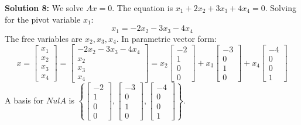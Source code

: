 \documentclass[11pt]{article}
\begin{document}
\vspace{0.3cm}
\textbf{Solution 8:} We solve $Ax = 0$. The equation is $x_1 + 2x_2 + 3x_3 + 4x_4 = 0$.
Solving for the pivot variable $x_1$:
$$ x_1 = -2x_2 - 3x_3 - 4x_4 $$
The free variables are $x_2, x_3, x_4$. In parametric vector form:
$$ x = \begin{bmatrix} x_1 \\ x_2 \\ x_3 \\ x_4 \end{bmatrix} = \begin{bmatrix} -2x_2 - 3x_3 - 4x_4 \\ x_2 \\ x_3 \\ x_4 \end{bmatrix} = x_2 \begin{bmatrix} -2 \\ 1 \\ 0 \\ 0 \end{bmatrix} + x_3 \begin{bmatrix} -3 \\ 0 \\ 1 \\ 0 \end{bmatrix} + x_4 \begin{bmatrix} -4 \\ 0 \\ 0 \\ 1 \end{bmatrix} $$
A basis for $Nul A$ is $\left\{ \begin{bmatrix} -2 \\ 1 \\ 0 \\ 0 \end{bmatrix}, \begin{bmatrix} -3 \\ 0 \\ 1 \\ 0 \end{bmatrix}, \begin{bmatrix} -4 \\ 0 \\ 0 \\ 1 \end{bmatrix} \right\}$.
\end{document}

